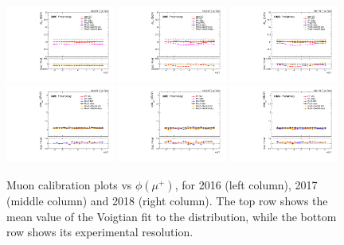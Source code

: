 \begin{figure}[!htb]
      \centering
      \captionsetup{justification=justified}
      \includegraphics[width=0.32\textwidth]{pics/muon_corr/muon_cal/2016/muP_phi_summary_mean.pdf}
      \includegraphics[width=0.32\textwidth]{pics/muon_corr/muon_cal/2017/muP_phi_summary_mean.pdf}
      \includegraphics[width=0.32\textwidth]{pics/muon_corr/muon_cal/2018/muP_phi_summary_mean.pdf}
      \includegraphics[width=0.32\textwidth]{pics/muon_corr/muon_cal/2016/muP_phi_summary_reso.pdf}
      \includegraphics[width=0.32\textwidth]{pics/muon_corr/muon_cal/2017/muP_phi_summary_reso.pdf}
      \includegraphics[width=0.32\textwidth]{pics/muon_corr/muon_cal/2018/muP_phi_summary_reso.pdf}
      \caption{Muon calibration plots vs $\phi(\mu^{+})$, for 2016 (left column), 2017 (middle column) and 2018 (right column).
              The top row shows the mean value of the Voigtian fit to the \mmm distribution, 
              while the bottom row shows its experimental resolution.}
      \label{fig:mucal_muP_phi}
\end{figure}


